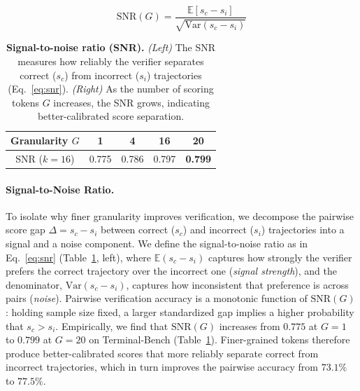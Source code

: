 \begin{table}[h!]
    \centering
    \begin{minipage}{0.40\linewidth}
        \centering
        \begin{equation}
        \mathrm{SNR}(G) = \frac{\mathbb{E}[s_c - s_i]}{\sqrt{\mathrm{Var}(s_c - s_i)}}
        \label{eq:snr}
        \end{equation}
    \end{minipage}\hfill
    \begin{minipage}{0.56\linewidth}
        \centering
        \small
        \begin{tabular}{ccccc}
        \toprule
        Granularity $G$ & 1 & 4 & 16 & 20 \\
        \midrule
        SNR ($k{=}16$) & 0.775 & 0.786 & 0.797 & \textbf{0.799} \\
        \bottomrule
        \end{tabular}
    \end{minipage}
    \caption{\textbf{Signal-to-noise ratio (SNR).} \emph{(Left)} The SNR measures how reliably the verifier separates correct ($s_c$) from incorrect ($s_i$) trajectories (Eq.~\ref{eq:snr}). \emph{(Right)} As the number of scoring tokens $G$ increases, the SNR grows, indicating better-calibrated score separation.}
    \label{tab:snr}
\end{table}

\paragraph{Signal-to-Noise Ratio.} To isolate why finer granularity improves verification, we decompose the pairwise score gap $\Delta = s_c - s_i$ between correct ($s_c$) and incorrect ($s_i$) trajectories into a signal and a noise component. We define the signal-to-noise ratio as in Eq.~\ref{eq:snr} (Table~\ref{tab:snr}, left), where $\mathbb{E}(s_c-s_i)$ captures how strongly the verifier prefers the correct trajectory over the incorrect one (\emph{signal strength}), and the denominator, $\mathrm{Var}(s_c - s_i)$, captures how inconsistent that preference is across pairs (\emph{noise}). Pairwise verification accuracy is a monotonic function of $\mathrm{SNR}(G)$: holding sample size fixed, a larger standardized gap implies a higher probability that $s_c>s_i$. Empirically, we find that $\mathrm{SNR}(G)$ increases from $0.775$ at $G{=}1$ to $0.799$ at $G{=}20$ on Terminal-Bench (Table~\ref{tab:snr}). Finer-grained tokens therefore produce better-calibrated scores that more reliably separate correct from incorrect trajectories, which in turn improves the pairwise accuracy from $73.1\%$ to $77.5\%$.

